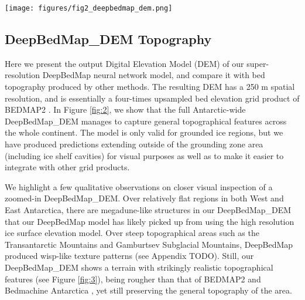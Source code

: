 \documentclass[tc, manuscript]{copernicus}
\begin{document}
\begin{figure*}[ht]
    \centering
    \texttt{[image: figures/fig2\_deepbedmap\_dem.png]}
    \caption{
      DeepBedMap\_DEM over the entire Antarctic continent.
      Plotted on an Antarctic Stereographic Projection (EPSG:3031) with elevation referenced to the WGS84 datum.
      Grounding line is plotted as thin black line.
      Purple box shows Pine Island Glacier extent used in Figure \ref{fig:3}.
      Yellow box shows Thwaites Glacier extent used in Figure \ref{fig:4}
      Orange areas show locations of training tiles (see Table \ref{table:groundtruthdata}).
    }
    \label{fig:2}
\end{figure*}

\subsection{DeepBedMap\_DEM Topography}

Here we present the output Digital Elevation Model (DEM) of our super-resolution DeepBedMap neural network model, and compare it with bed topography produced by other methods.
The resulting DEM has a 250 m spatial resolution, and is essentially a four-times upsampled bed elevation grid product of BEDMAP2 \citep{FretwellBedmap2improvedice2013}.
In Figure \ref{fig:2}, we show that the full Antarctic-wide DeepBedMap\_DEM manages to capture general topographical features across the whole continent.
The model is only valid for grounded ice regions, but we have produced predictions extending outside of the grounding zone area (including ice shelf cavities) for visual purposes as well as to make it easier to integrate with other grid products.

We highlight a few qualitative observations on closer visual inspection of a zoomed-in DeepBedMap\_DEM.
Over relatively flat regions in both West and East Antarctica, there are megadune-like structures \citep{ScambosSnowMegadune2014} in our DeepBedMap\_DEM that our DeepBedMap model has likely picked up from using the high resolution ice surface elevation model.
Over steep topographical areas such as the Transantarctic Mountains and Gamburtsev Subglacial Mountains, DeepBedMap produced wisp-like texture patterns (see Appendix TODO).
Still, our DeepBedMap\_DEM shows a terrain with strikingly realistic topographical features (see Figure \ref{fig:3}), being rougher than that of BEDMAP2 \citep{FretwellBedmap2improvedice2013} and Bedmachine Antarctica \citep{MorlighemMEaSUREsBedMachineAntarctica2019}, yet still preserving the general topography of the area.
\end{document}
